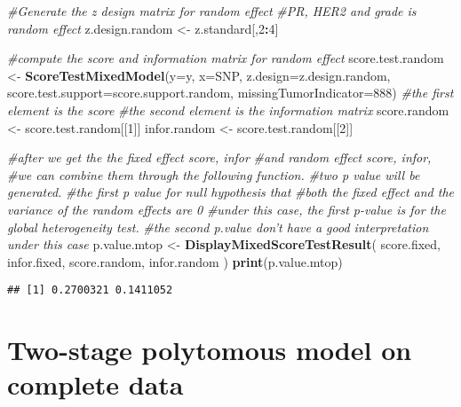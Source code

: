 \documentclass[11pt,]{article}
\newenvironment{Shaded}{\begin{snugshade}}{\end{snugshade}}
\newcommand{\CommentTok}[1]{\textcolor[rgb]{0.56,0.35,0.01}{\textit{#1}}}
\newcommand{\DataTypeTok}[1]{\textcolor[rgb]{0.13,0.29,0.53}{#1}}
\newcommand{\DecValTok}[1]{\textcolor[rgb]{0.00,0.00,0.81}{#1}}
\newcommand{\KeywordTok}[1]{\textcolor[rgb]{0.13,0.29,0.53}{\textbf{#1}}}
\newcommand{\NormalTok}[1]{#1}
\newcommand{\OperatorTok}[1]{\textcolor[rgb]{0.81,0.36,0.00}{\textbf{#1}}}
\newcommand{\StringTok}[1]{\textcolor[rgb]{0.31,0.60,0.02}{#1}}
\begin{document}
\begin{Shaded}
\begin{Highlighting}[]
\CommentTok{#Generate the z design matrix for random effect}
\CommentTok{#PR, HER2 and grade is random effect}
\NormalTok{z.design.random <-}\StringTok{ }\NormalTok{z.standard[,}\DecValTok{2}\OperatorTok{:}\DecValTok{4}\NormalTok{]}

\CommentTok{#compute the score and information matrix for random effect}
\NormalTok{score.test.random <-}\StringTok{ }\KeywordTok{ScoreTestMixedModel}\NormalTok{(}\DataTypeTok{y=}\NormalTok{y,}
                                         \DataTypeTok{x=}\NormalTok{SNP,}
                                         \DataTypeTok{z.design=}\NormalTok{z.design.random,}
                                         \DataTypeTok{score.test.support=}\NormalTok{score.support.random,}
                                         \DataTypeTok{missingTumorIndicator=}\DecValTok{888}\NormalTok{)}
\CommentTok{#the first element is the score}
\CommentTok{#the second element is the information matrix}
\NormalTok{score.random <-}\StringTok{ }\NormalTok{score.test.random[[}\DecValTok{1}\NormalTok{]]}
\NormalTok{infor.random <-}\StringTok{ }\NormalTok{score.test.random[[}\DecValTok{2}\NormalTok{]]}

\CommentTok{#after we get the the fixed effect score, infor }
\CommentTok{#and random effect score, infor, }
\CommentTok{#we can combine them through the following function. }
\CommentTok{#two p value will be generated.}
\CommentTok{#the first p value for null hypothesis that}
\CommentTok{#both the fixed effect and the variance of the random effects are 0}
\CommentTok{#under this case, the first p-value is for the global heterogeneity test.}
\CommentTok{#the second p.value don't have a good interpretation under this case}
\NormalTok{p.value.mtop <-}\StringTok{ }\KeywordTok{DisplayMixedScoreTestResult}\NormalTok{(}
\NormalTok{  score.fixed,}
\NormalTok{  infor.fixed,}
\NormalTok{  score.random,}
\NormalTok{  infor.random}
\NormalTok{)  }
\KeywordTok{print}\NormalTok{(p.value.mtop)}
\end{Highlighting}
\end{Shaded}

\begin{verbatim}
## [1] 0.2700321 0.1411052
\end{verbatim}

\hypertarget{two-stage-polytomous-model-on-complete-data}{%
\section{Two-stage polytomous model on complete
data}\label{two-stage-polytomous-model-on-complete-data}}
\end{document}
